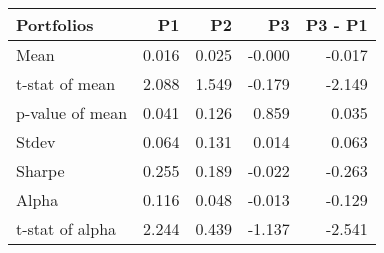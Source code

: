 \begin{tabular}{lrrrr}
\toprule
Portfolios & P1 & P2 & P3 & P3 - P1 \\
\midrule
Mean & 0.016 & 0.025 & -0.000 & -0.017 \\
t-stat of mean & 2.088 & 1.549 & -0.179 & -2.149 \\
p-value of mean & 0.041 & 0.126 & 0.859 & 0.035 \\
Stdev & 0.064 & 0.131 & 0.014 & 0.063 \\
Sharpe & 0.255 & 0.189 & -0.022 & -0.263 \\
Alpha & 0.116 & 0.048 & -0.013 & -0.129 \\
t-stat of alpha & 2.244 & 0.439 & -1.137 & -2.541 \\
\bottomrule
\end{tabular}
